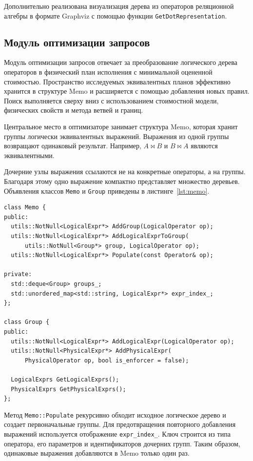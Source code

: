 \documentclass[14pt, russian]{scrartcl}
\begin{document}
Дополнительно реализована визуализация дерева из операторов реляционной алгебры
в формате Graphviz с помощью функции \verb|GetDotRepresentation|.

\subsection{Модуль оптимизации запросов}

Модуль оптимизации запросов отвечает за преобразование логического дерева
операторов в физический план исполнения с минимальной оцененной стоимостью.
Пространство исследуемых эквивалентных планов эффективно хранится в структуре
Memo и расширяется с помощью добавления новых правил. Поиск выполняется сверху
вниз с использованием стоимостной модели, физических свойств и метода ветвей и
границ.

Центральное место в оптимизаторе занимает структура Memo, которая хранит группы
логически эквивалентных выражений. Выражения из одной группы возвращают
одинаковый результат. Например, $A \Join B$ и $B \Join A$ являются
эквивалентными.

Дочерние узлы выражения ссылаются не на конкретные операторы, а на группы.
Благодаря этому одно выражение компактно представляет множество деревьев.
Объявления классов \verb|Memo| и \verb|Group| приведены в
листинге~\ref{lst:memo}.

\begin{listing}[H]
  \caption{Основные элементы структуры Memo.}
  \label{lst:memo}
  \begin{verbatim}
class Memo {
public:
  utils::NotNull<LogicalExpr*> AddGroup(LogicalOperator op);
  utils::NotNull<LogicalExpr*> AddLogicalExprToGroup(
      utils::NotNull<Group*> group, LogicalOperator op);
  utils::NotNull<LogicalExpr*> Populate(const Operator& op);

private:
  std::deque<Group> groups_;
  std::unordered_map<std::string, LogicalExpr*> expr_index_;
};

class Group {
public:
  utils::NotNull<LogicalExpr*> AddLogicalExpr(LogicalOperator op);
  utils::NotNull<PhysicalExpr*> AddPhysicalExpr(
      PhysicalOperator op, bool is_enforcer = false);

  LogicalExprs GetLogicalExprs();
  PhysicalExprs GetPhysicalExprs();
};
  \end{verbatim}
\end{listing}

Метод \verb|Memo::Populate| рекурсивно обходит исходное логическое дерево и
создает первоначальные группы. Для предотвращения повторного добавления
выражений используется отображение \verb|expr_index_|. Ключ строится из типа
оператора, его параметров и идентификаторов дочерних групп. Таким образом,
одинаковые выражения добавляются в Memo только один раз.
\end{document}
